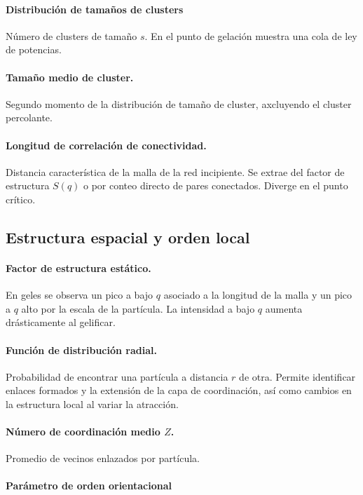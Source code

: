 \documentclass[../main.tex]{subfiles}
\begin{document}
\paragraph{Distribución de tamaños de clusters}
Número de clusters de tamaño \(s\).
En el punto de gelación muestra una cola de ley de potencias.

\paragraph{Tamaño medio de cluster.}
Segundo momento de la distribución de tamaño de cluster, axcluyendo el cluster percolante.

\paragraph{Longitud de correlación de conectividad.}
Distancia característica de la malla de la red incipiente.
Se extrae del factor de estructura \(S(q)\) o por conteo directo de pares conectados.
Diverge en el punto crítico.


\subsection{Estructura espacial y orden local}

\paragraph{Factor de estructura estático.}
En geles se observa un pico a bajo \(q\) asociado a la longitud de la malla y un pico a \(q\) alto por la escala de la partícula.
La intensidad a bajo \(q\) aumenta drásticamente al gelificar.

\paragraph{Función de distribución radial.}
Probabilidad de encontrar una partícula a distancia \(r\) de otra.
Permite identificar enlaces formados y la extensión de la capa de coordinación, así como cambios en la estructura local al variar la atracción.

\paragraph{Número de coordinación medio \(Z\).}
Promedio de vecinos enlazados por partícula.

\paragraph{Parámetro de orden orientacional}
\end{document}
